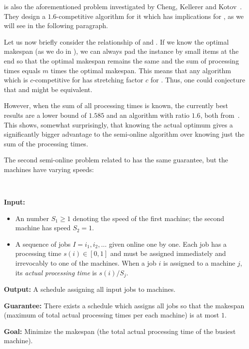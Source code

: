 \schedulingtpt is also the aforementioned problem investigated by
Cheng, Kellerer and Kotov~\cite{cheng05}. They design a $1.6$-competitive
algorithm for it which has implications for \binstretch, as we will
see in the following paragraph.

Let us now briefly consider the relationship of \binstretch and
\schedulingtpt. If we know the optimal makespan (as we do in
\binstretch), we can always pad the instance by small items at the end
so that the optimal makespan remains the same and the sum of
processing times equals $m$ times the optimal makespan. This means
that any algorithm which is $c$-competitive for \schedulingtpt has
stretching factor $c$ for \binstretch. Thus, one could conjecture that
\binstretch and \schedulingtpt might be equivalent.

However, when the sum of all processing times is known, the currently
best results are a lower bound of $1.585$ and an algorithm with ratio
$1.6$, both from~\cite{DBLP:journals/tcs/AlbersH12}. This shows,
somewhat surprisingly, that knowing the actual optimum gives a
significantly bigger advantage to the semi-online algorithm over
knowing just the sum of the processing times.

The second semi-online problem related to \binstretch has the same
guarantee, but the machines have varying speeds:

\begin{prb}~
\label{prb:binstretchingspeeds}

\smallskip

\noindent\textbf{Input:}

\begin{itemize}
\item An number $S_1 \ge 1$ denoting the speed of the first machine;
the second machine has speed $S_2 = 1$.
\item A sequence of jobs $I=i_1, i_2, \ldots$ given online one by one. Each job has
a processing time $s(i) \in [0,1]$ and must be assigned immediately and irrevocably
to one of the machines. When a job $i$ is assigned to a machine $j$, its \emph{actual processing
time} is $s(i)/S_j$.
\end{itemize}

\noindent\textbf{Output:} A schedule assigning all input jobs to machines.

\noindent\textbf{Guarantee:} There exists a schedule which assigns all
jobs so that the makespan (maximum of total actual processing times
per each machine) is at most $1$.

\noindent\textbf{Goal:} Minimize the makespan (the total actual
processing time of the busiest machine).

\noindent
\smallskip
\end{prb}

